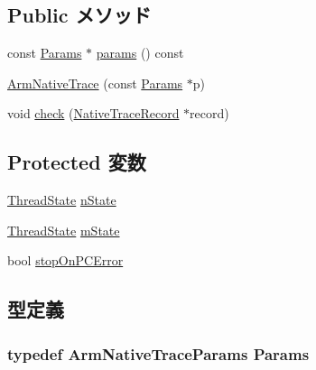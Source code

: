 \subsection*{Public メソッド}
\begin{DoxyCompactItemize}
\item 
const \hyperlink{classTrace_1_1ArmNativeTrace_a7c28c46dd6590e680f44a6066c34caf5}{Params} $\ast$ \hyperlink{classTrace_1_1ArmNativeTrace_acd3c3feb78ae7a8f88fe0f110a718dff}{params} () const 
\item 
\hyperlink{classTrace_1_1ArmNativeTrace_a6699da1dc0472e2f7ce1251437768491}{ArmNativeTrace} (const \hyperlink{classTrace_1_1ArmNativeTrace_a7c28c46dd6590e680f44a6066c34caf5}{Params} $\ast$p)
\item 
void \hyperlink{classTrace_1_1ArmNativeTrace_a826e1279dfa7dd9ce6760a2e6efe4116}{check} (\hyperlink{classTrace_1_1NativeTraceRecord}{NativeTraceRecord} $\ast$record)
\end{DoxyCompactItemize}
\subsection*{Protected 変数}
\begin{DoxyCompactItemize}
\item 
\hyperlink{structTrace_1_1ArmNativeTrace_1_1ThreadState}{ThreadState} \hyperlink{classTrace_1_1ArmNativeTrace_a9b1e159170b558aeaa3694f2183d4d68}{nState}
\item 
\hyperlink{structTrace_1_1ArmNativeTrace_1_1ThreadState}{ThreadState} \hyperlink{classTrace_1_1ArmNativeTrace_a72f1181d2c4bc9244a9bea747b68881f}{mState}
\item 
bool \hyperlink{classTrace_1_1ArmNativeTrace_a6fa1bc6237b1cf2fae7eadeb1daafe32}{stopOnPCError}
\end{DoxyCompactItemize}


\subsection{型定義}
\hypertarget{classTrace_1_1ArmNativeTrace_a7c28c46dd6590e680f44a6066c34caf5}{
\subsubsection[{Params}]{\setlength{\rightskip}{0pt plus 5cm}typedef ArmNativeTraceParams {\bf Params}}}
\label{classTrace_1_1ArmNativeTrace_a7c28c46dd6590e680f44a6066c34caf5}


